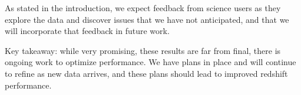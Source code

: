 As stated in the introduction, we expect feedback from science users as they explore the data and discover issues that we have not anticipated, and that we will incorporate that feedback in future work.

Key takeaway: while very promising, these results are far from final, there is ongoing work to optimize \photoz performance.  We have plans in place and will continue to refine as new data arrives, and these plans should lead to improved redshift performance. 

\pagebreak




